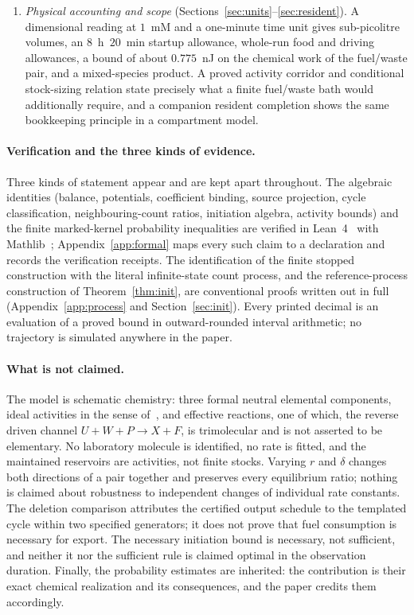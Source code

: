 \documentclass[11pt,a4paper]{article}
\theoremstyle{plain}
\theoremstyle{definition}
\theoremstyle{remark}
\begin{document}
\begin{enumerate}[label=(\roman*)]
\item \emph{Physical accounting and scope} (Sections~\ref{sec:units}--\ref{sec:resident}). A dimensional reading at $1$~mM and a one-minute time unit gives sub-picolitre volumes, an $8$~h~$20$~min startup allowance, whole-run food and driving allowances, a bound of about $0.775$~nJ on the chemical work of the fuel/waste pair, and a mixed-species product. A proved activity corridor and conditional stock-sizing relation state precisely what a finite fuel/waste bath would additionally require, and a companion resident completion shows the same bookkeeping principle in a compartment model.
\end{enumerate}

\paragraph{Verification and the three kinds of evidence.}
Three kinds of statement appear and are kept apart throughout. The algebraic identities (balance, potentials, coefficient binding, source projection, cycle classification, neighbouring-count ratios, initiation algebra, activity bounds) and the finite marked-kernel probability inequalities are verified in Lean~4~\citep{demoura2021} with Mathlib~\citep{mathlib2020}; Appendix~\ref{app:formal} maps every such claim to a declaration and records the verification receipts. The identification of the finite stopped construction with the literal infinite-state count process, and the reference-process construction of Theorem~\ref{thm:init}, are conventional proofs written out in full (Appendix~\ref{app:process} and Section~\ref{sec:init}). Every printed decimal is an evaluation of a proved bound in outward-rounded interval arithmetic; no trajectory is simulated anywhere in the paper.

\paragraph{What is not claimed.}
The model is schematic chemistry: three formal neutral elemental components, ideal activities in the sense of~\citep{rao2016,avanzini2021}, and effective reactions, one of which, the reverse driven channel $U+W+P\to X+F$, is trimolecular and is not asserted to be elementary. No laboratory molecule is identified, no rate is fitted, and the maintained reservoirs are activities, not finite stocks. Varying $r$ and $\delta$ changes both directions of a pair together and preserves every equilibrium ratio; nothing is claimed about robustness to independent changes of individual rate constants. The deletion comparison attributes the certified output schedule to the templated cycle within two specified generators; it does not prove that fuel consumption is necessary for export. The necessary initiation bound is necessary, not sufficient, and neither it nor the sufficient rule is claimed optimal in the observation duration. Finally, the probability estimates are inherited: the contribution is their exact chemical realization and its consequences, and the paper credits them accordingly.
\end{document}
